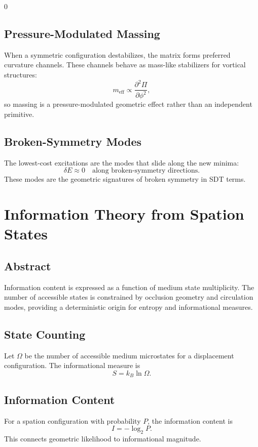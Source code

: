 0\documentclass[12pt]{book}
\begin{document}
\section{Pressure-Modulated Massing}
When a symmetric configuration destabilizes, the matrix forms preferred curvature channels. These
channels behave as mass-like stabilizers for vortical structures:
\begin{equation}
m_{\text{eff}} \propto \frac{\partial^2 \Pi}{\partial \phi^2},
\end{equation}
so massing is a pressure-modulated geometric effect rather than an independent primitive.

\section{Broken-Symmetry Modes}
The lowest-cost excitations are the modes that slide along the new minima:
\begin{equation}
\delta E \approx 0 \quad \text{along broken-symmetry directions}.
\end{equation}
These modes are the geometric signatures of broken symmetry in SDT terms.

\chapter{Information Theory from Spation States}

\section*{Abstract}
Information content is expressed as a function of medium state multiplicity. The number of accessible
states is constrained by occlusion geometry and circulation modes, providing a deterministic origin for
entropy and informational measures.

\section{State Counting}
Let $\Omega$ be the number of accessible medium microstates for a displacement configuration. The
informational measure is
\begin{equation}
S = k_B \ln \Omega.
\end{equation}

\section{Information Content}
For a spation configuration with probability $P$, the information content is
\begin{equation}
I = -\log_2 P.
\end{equation}
This connects geometric likelihood to informational magnitude.
\end{document}
